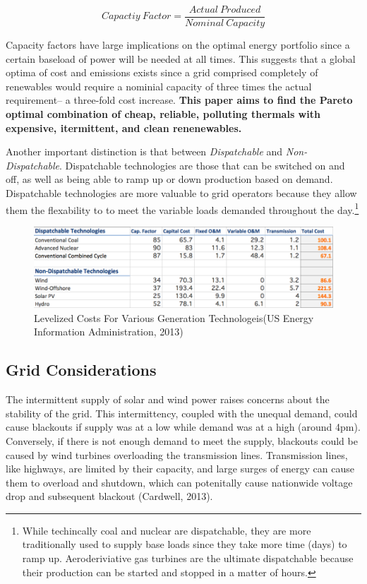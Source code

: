 \documentclass{article}
\begin{document}
\begin{equation}
Capactiy \: Factor = \frac{Actual \: Produced}{Nominal \: Capacity}
\end{equation}

Capacity factors have large implications on the optimal energy portfolio since a certain baseload of power will be needed at all times. This suggests that a global optima of cost and emissions exists since a grid comprised completely of renewables would require a nominial capacity of three times the actual requirement-- a three-fold cost increase. {\bf This paper aims to find the Pareto optimal combination of cheap, reliable, polluting thermals with expensive, itermittent, and clean renenewables. }\*

Another important distinction is that between \emph{Dispatchable} and \emph{Non-Dispatchable}. Dispatchable technologies are those that can be switched on and off, as well as being able to ramp up or down production based on demand. Dispatchable technologies are more valuable to grid operators because they allow them the flexability to to meet the variable loads demanded throughout the day.\footnote{While techincally coal and nuclear are dispatchable, they are more traditionally used to supply base loads since they take more time (days) to ramp up. Aeroderiviative gas turbines are the ultimate dispatchable because their production can be started and stopped in a matter of hours.}

\begin{figure}[H]
	\begin{center}
	\includegraphics[scale = .5]{Figures/costssource.png}
	\caption{Levelized Costs For Various Generation Technologeis(US Energy Information Administration, 2013)}
	\end{center}
\end{figure}


\subsection{Grid Considerations}
The intermittent supply of solar and wind power raises concerns about the stability of the grid. This intermittency, coupled with the unequal demand, could cause blackouts if supply was at a low while demand was at a high (around 4pm). Conversely, if there is not enough demand to meet the supply, blackouts could be caused by wind turbines overloading the transmission lines. Transmission lines, like highways, are limited by their capacity, and large surges of energy can cause them to overload and shutdown, which can potenitally cause nationwide voltage drop and subsequent blackout (Cardwell, 2013).   
\end{document}
